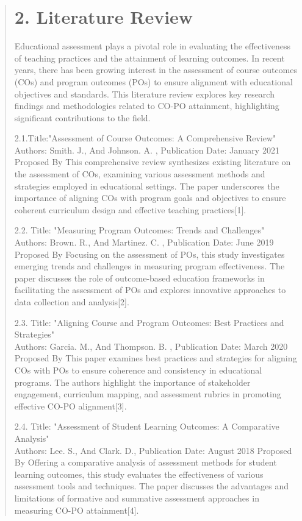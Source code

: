 \documentclass[12pt]{report}
\begin{document}
	\begin{quote}
		\section{ 2. Literature Review }
		\hspace{1cm}Educational assessment plays a pivotal role in evaluating the effectiveness of teaching practices and the attainment of learning outcomes. In recent years, there has been growing interest in the assessment of course outcomes (COs) and program outcomes (POs) to ensure alignment with educational objectives and standards. This literature review explores key research findings and methodologies related to CO-PO attainment, highlighting significant contributions to the field.
		
		2.1.Title:"Assessment of Course Outcomes: A Comprehensive Review"
		\\
		Authors: Smith. J., And Johnson. A. ,
		Publication Date: January 2021 Proposed By
		This comprehensive review synthesizes existing literature on the assessment of COs, examining various assessment methods and strategies employed in educational settings. The paper underscores the importance of aligning COs with program goals and objectives to ensure coherent curriculum design and effective teaching practices[1].
		
		2.2. Title: "Measuring Program Outcomes: Trends and Challenges"
		\\
		Authors: Brown. R., And Martinez. C. ,
		Publication Date: June 2019 Proposed By
		Focusing on the assessment of POs, this study investigates emerging trends and challenges in measuring program effectiveness. The paper discusses the role of outcome-based education frameworks in facilitating the assessment of POs and explores innovative approaches to data collection and analysis[2].
		
		2.3. Title: "Aligning Course and Program Outcomes: Best Practices and Strategies"
		\\
		Authors: Garcia. M., And Thompson. B. ,
		Publication Date: March 2020 Proposed By
		This paper examines best practices and strategies for aligning COs with POs to ensure coherence and consistency in educational programs. The authors highlight the importance of stakeholder engagement, curriculum mapping, and assessment rubrics in promoting effective CO-PO alignment[3].
		\clearpage
		
		2.4. Title: "Assessment of Student Learning Outcomes: A Comparative Analysis"
		\\
		Authors: Lee. S., And Clark. D.,
		Publication Date: August 2018 Proposed By
		Offering a comparative analysis of assessment methods for student learning outcomes, this study evaluates the effectiveness of various assessment tools and techniques. The paper discusses the advantages and limitations of formative and summative assessment approaches in measuring CO-PO attainment[4].
		

\end{quote}
\end{document}
